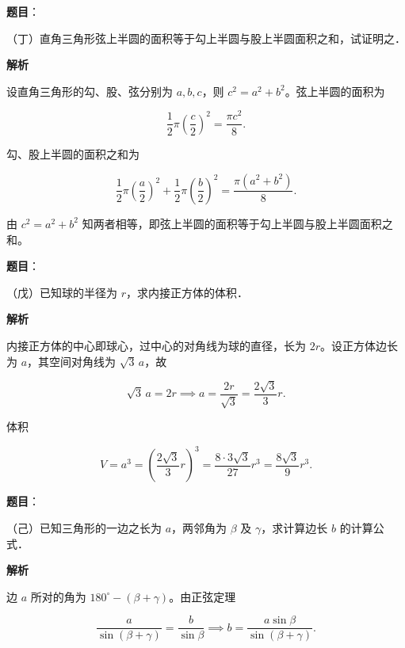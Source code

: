 \begin{answer}

\textbf{题目}：

（丁）直角三角形弦上半圆的面积等于勾上半圆与股上半圆面积之和，试证明之．

\textbf{解析}

设直角三角形的勾、股、弦分别为 $a,b,c$，则 $c^2=a^2+b^2$。弦上半圆的面积为

\nopagebreak[4]
\[
\frac12\pi\left(\frac c2\right)^2=\frac{\pi c^2}{8}.
\]

勾、股上半圆的面积之和为

\nopagebreak[4]
\[
\frac12\pi\left(\frac a2\right)^2+\frac12\pi\left(\frac b2\right)^2
=\frac{\pi(a^2+b^2)}{8}.
\]

由 $c^2=a^2+b^2$ 知两者相等，即弦上半圆的面积等于勾上半圆与股上半圆面积之和。


\end{answer}
\begin{answer}

\textbf{题目}：

（戊）已知球的半径为 $r$，求内接正方体的体积．

\textbf{解析}

内接正方体的中心即球心，过中心的对角线为球的直径，长为 $2r$。设正方体边长为 $a$，其空间对角线为 $\sqrt3\,a$，故

\nopagebreak[4]
\[
\sqrt3\,a=2r\implies a=\frac{2r}{\sqrt3}=\frac{2\sqrt3}{3}r.
\]

体积

\nopagebreak[4]
\[
V=a^3=\left(\frac{2\sqrt3}{3}r\right)^3=\frac{8\cdot3\sqrt3}{27}r^3=\frac{8\sqrt3}{9}r^3.
\]


\end{answer}
\begin{answer}

\textbf{题目}：

（己）已知三角形的一边之长为 $a$，两邻角为 $\beta$ 及 $\gamma$，求计算边长 $b$ 的计算公式．

\textbf{解析}

边 $a$ 所对的角为 $180^\circ-(\beta+\gamma)$。由正弦定理

\nopagebreak[4]
\[
\frac a{\sin(\beta+\gamma)}=\frac b{\sin\beta}
\implies b=\frac{a\sin\beta}{\sin(\beta+\gamma)}.
\]


\par\medskip

\end{answer}

